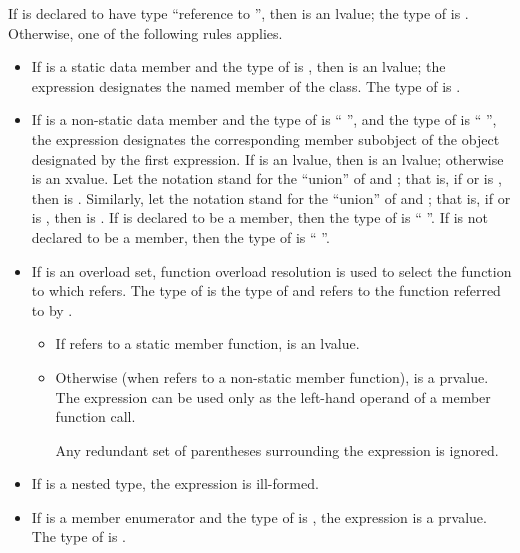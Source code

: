 \pnum
If  is declared to have type ``reference to '', then
 is an lvalue; the type of  is .
Otherwise, one of the following rules applies.
\begin{itemize}
\item If  is a static data member and the type of 
is , then  is an lvalue; the expression designates
the named member of the class. The type of  is .

\item If  is a non-static data member and the type of
 is `` '', and the type of 
is `` '', the expression designates the corresponding
member subobject of the object designated by the first expression. If 
is an lvalue, then  is an lvalue;
otherwise  is an xvalue.
Let the notation  stand for the ``union'' of
 and ; that is, if  or 
is , then  is . Similarly,
let the notation  stand for the ``union'' of 
and ; that is, if  or  is
, then  is . If  is
declared to be a  member, then the type of 
is `` ''. If  is not declared to be a
 member, then the type of  is
``  ''.

\item If  is an overload set,
function overload resolution
is used to select the function to which  refers.
The type of  is the type of 
and  refers to the function referred to by .

\begin{itemize}
\item If  refers to a static member function,
 is an lvalue.

\item Otherwise (when  refers to a non-static member function),
 is a prvalue. The expression can be used only as the
left-hand operand of a member function call.
\begin{note}
Any redundant set of parentheses surrounding the expression
is ignored.
\end{note}
\end{itemize}

\item If  is a nested type, the expression  is
ill-formed.

\item If  is a member enumerator and the type of 
is , the expression  is a prvalue. The type of
 is .
\end{itemize}

